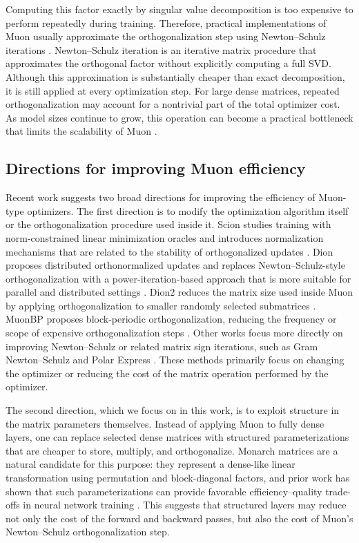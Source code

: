 \documentclass{article}
\begin{document}
Computing this factor exactly by singular value decomposition is too expensive to perform repeatedly during training. Therefore, practical implementations of Muon usually approximate the orthogonalization step using Newton--Schulz iterations \cite{jordan2024muon}. Newton--Schulz iteration is an iterative matrix procedure that approximates the orthogonal factor without explicitly computing a full SVD. Although this approximation is substantially cheaper than exact decomposition, it is still applied at every optimization step. For large dense matrices, repeated orthogonalization may account for a nontrivial part of the total optimizer cost. As model sizes continue to grow, this operation can become a practical bottleneck that limits the scalability of Muon \cite{liu2025muonscalablellmtraining}.

\subsection{Directions for improving Muon efficiency}

Recent work suggests two broad directions for improving the efficiency of Muon-type optimizers. The first direction is to modify the optimization algorithm itself or the orthogonalization procedure used inside it. Scion studies training with norm-constrained linear minimization oracles and introduces normalization mechanisms that are related to the stability of orthogonalized updates \cite{pethick2025trainingdeeplearningmodels}. Dion proposes distributed orthonormalized updates and replaces Newton--Schulz-style orthogonalization with a power-iteration-based approach that is more suitable for parallel and distributed settings \cite{ahn2025diondistributedorthonormalizedupdates}. Dion2 reduces the matrix size used inside Muon by applying orthogonalization to smaller randomly selected submatrices \cite{ahn2025dion2simplemethodshrink}. MuonBP proposes block-periodic orthogonalization, reducing the frequency or scope of expensive orthogonalization steps \cite{khaled2025muonbpfastermuonblockperiodic}. Other works focus more directly on improving Newton--Schulz or related matrix sign iterations, such as Gram Newton--Schulz \cite{GramNewtonSchulz} and Polar Express \cite{amsel2026polarexpressoptimalmatrix}. These methods primarily focus on changing the optimizer or reducing the cost of the matrix operation performed by the optimizer.

The second direction, which we focus on in this work, is to exploit structure in the matrix parameters themselves. Instead of applying Muon to fully dense layers, one can replace selected dense matrices with structured parameterizations that are cheaper to store, multiply, and orthogonalize. Monarch matrices are a natural candidate for this purpose: they represent a dense-like linear transformation using permutation and block-diagonal factors, and prior work has shown that such parameterizations can provide favorable efficiency--quality trade-offs in neural network training \cite{dao2022monarchexpressivestructuredmatrices}. This suggests that structured layers may reduce not only the cost of the forward and backward passes, but also the cost of Muon's Newton--Schulz orthogonalization step.
\end{document}
